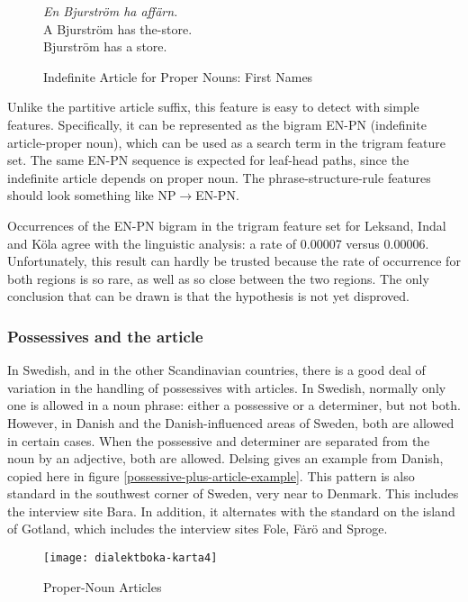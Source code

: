 \begin{figure}
  {\it En Bjurstr\"om ha aff\"arn.} \\
  A Bjurstr\"om has the-store. \\
  Bjurstr\"om has a store. \\
  \caption{Indefinite Article for Proper Nouns: First Names}
  \label{indefinite-article-proper-noun}
\end{figure}

Unlike the partitive article suffix, this feature is easy to detect
with simple features. Specifically, it can be represented as the
bigram EN-PN (indefinite article-proper noun), which can be used as a
search term in the trigram feature set. The same EN-PN sequence is
expected for leaf-head paths, since the indefinite article depends on
proper noun. The phrase-structure-rule features should
look something like NP$\to$EN-PN.

Occurrences of the EN-PN bigram in the trigram feature set for
Leksand, Indal and K\"ola agree with the linguistic analysis: a rate
of 0.00007 versus 0.00006. Unfortunately, this result can hardly be
trusted because the rate of occurrence for both regions is so rare, as
well as so close between the two regions. The only conclusion that can
be drawn is that the hypothesis is not yet disproved.

\subsubsection{Possessives and the article}

In Swedish, and in the other Scandinavian countries, there is a good
deal of variation in the handling of possessives with articles. In
Swedish, normally only one is allowed in a noun phrase: either a
possessive or a determiner, but not both. However, in Danish and the
Danish-influenced areas of Sweden, both are allowed in certain
cases. When the possessive and determiner are separated from the noun
by an adjective, both are allowed. Delsing gives an example from
Danish, copied here in figure \ref{possessive-plus-article-example}.
This pattern is also standard in the southwest corner of Sweden, very
near to Denmark. This includes the interview site Bara. In addition,
it alternates with the standard on the island of Gotland, which
includes the interview sites Fole, F\.ar\"o and Sproge.

\begin{figure}
  \texttt{[image: dialektboka-karta4]}
  \caption{Proper-Noun Articles}
  \label{possessive-plus-article-map}
\end{figure}

